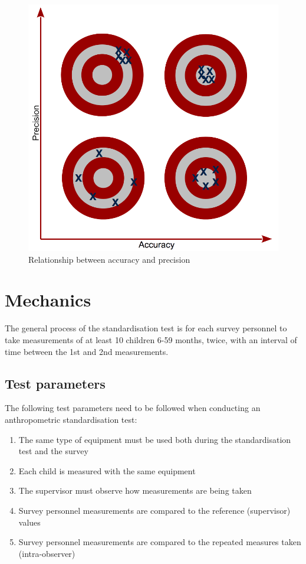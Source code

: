 \documentclass[12pt,a4paper]{book}
\theoremstyle{definition}
\theoremstyle{definition}
\theoremstyle{definition}
\theoremstyle{remark}
\begin{document}
\begin{figure}

{\centering \includegraphics[width=11.11in]{figures/accuracyPrecision} 

}

\caption{Relationship between accuracy and precision}\label{fig:standard01}
\end{figure}

\hypertarget{mechanics}{%
\section{Mechanics}\label{mechanics}}

The general process of the standardisation test is for each survey
personnel to take measurements of at least 10 children 6-59 months,
twice, with an interval of time between the 1st and 2nd measurements.

\hypertarget{test-parameters}{%
\subsection{Test parameters}\label{test-parameters}}

The following test parameters need to be followed when conducting an
anthropometric standardisation test:

\begin{enumerate}
\def\labelenumi{\arabic{enumi}.}
\item
  The same type of equipment must be used both during the
  standardisation test and the survey
\item
  Each child is measured with the same equipment
\item
  The supervisor must observe how measurements are being taken
\item
  Survey personnel measurements are compared to the reference
  (supervisor) values
\item
  Survey personnel measurements are compared to the repeated measures
  taken (intra-observer)
\end{enumerate}
\end{document}
